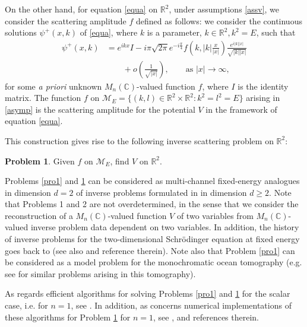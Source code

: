 \documentclass[11pt,a4paper,english,subeqn]{amsart}
\theoremstyle{plain}
\theoremstyle{definition}
\newtheorem{prob}{Problem}
\numberwithin{equation}{section}
\begin{document}
On the other hand, for equation \eqref{equa} on ${\mathbb{R}}^2$, under assumptions \eqref{assv}, we consider the scattering amplitude $f$ defined as follows: we consider the continuous solutions $\psi^+(x,k)$ of \eqref{equa}, where $k$ is a parameter, $k \in {\mathbb{R}}^2, k^2 =E$, such that
\begin{align} \label{asymp}
\psi^+(x,k) &= e^{ikx}I-i\pi\sqrt{2 \pi} e^{-i\frac{\pi}{4}}f\left(k, |k|\frac{x}{|x|}\right) \frac{e^{i|k||x|}}{\sqrt{|k||x|}}\\ \nonumber
&\qquad + o \left(\frac{1}{\sqrt{|x|}} \right), \qquad \text{as } |x| \to \infty,
\end{align}
for some \textit{a priori} unknown ${M_{n}({\mathbb{C}})}$-valued function $f$, where $I$ is the identity matrix. The function $f$ on $\mathscr{M}_E = \{ (k,l) \in {\mathbb{R}}^2 \times {\mathbb{R}}^2 : k^2 = l^2 = E \} $ arising in \eqref{asymp} is the scattering amplitude for the potential $V$ in the framework of equation \eqref{equa}.

This construction gives rise to the following inverse scattering problem on ${\mathbb{R}}^2$:

\begin{prob} \label{pro2}
Given $f$ on $\mathscr{M}_E$, find $V$ on ${\mathbb{R}}^2$.
\end{prob}

Problems \ref{pro1} and \ref{pro2} can be considered as multi-channel fixed-energy analogues in dimension $d=2$ of inverse problems formulated in \cite{G} in dimension $d \geq 2$. Note that Problems 1 and 2 are not overdetermined, in the sense that we consider the reconstruction of a ${M_{n}({\mathbb{C}})}$-valued function $V$ of two variables from ${M_{n}({\mathbb{C}})}$-valued inverse problem data dependent on two variables. In addition, the history of inverse problems for the two-dimensional Schr\"odinger equation at fixed energy goes back to \cite{DKN} (see also \cite{N2, Gr} and reference therein). Note also that Problem \ref{pro1} can be considered as a model problem for the monochromatic ocean tomography (e.g. see \cite{BBS} for similar problems arising in this tomography).

As regards efficient algorithms for solving Problems \ref{pro1} and \ref{pro2} for the scalar case, i.e. for $n=1$, see \cite{N1, N2, N3,N4}. In addition, as concerns numerical implementations of these algorithms for Problem \ref{pro2} for $n=1$, see \cite{BBMRS, BAR}, and references therein.
\end{document}
